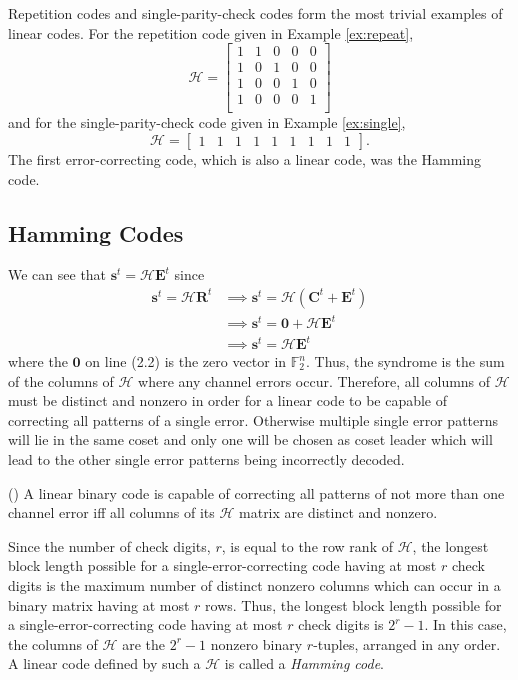 Repetition codes and single-parity-check codes form the most trivial examples of linear codes. For the repetition code given in Example \ref{ex:repeat},
\[
    \mathscr{H} = \left[\begin{array}{ccccc}
        1 & 1 & 0 & 0 & 0\\
        1 & 0 & 1 & 0 & 0\\
        1 & 0 & 0 & 1 & 0\\
        1 & 0 & 0 & 0 & 1\\
    \end{array}\right]
\]
and for the single-parity-check code given in Example \ref{ex:single},
\[
    \mathscr{H} = \left[\begin{array}{ccccccccc}
        1 & 1 & 1 & 1 & 1 & 1 & 1 & 1 & 1
    \end{array}\right].
\]
The first error-correcting code, which is also a linear code, was the Hamming code.

\subsection{Hamming Codes}

We can see that $\textbf{s}^t = \mathscr{H}\textbf{E}^t$ since
\begin{align}
    \textbf{s}^t = \mathscr{H}\textbf{R}^t &\implies \textbf{s}^t = \mathscr{H}\left(\textbf{C}^t + \textbf{E}^t\right)\\
    &\implies \textbf{s}^t = \textbf{0} + \mathscr{H}\textbf{E}^t\\
    &\implies \textbf{s}^t = \mathscr{H}\textbf{E}^t
\end{align}
where the $\textbf{0}$ on line (2.2) is the zero vector in $\mathbb{F}_2^n$. Thus, the syndrome is the sum of the columns of $\mathscr{H}$ where any channel errors occur. Therefore, all columns of $\mathscr{H}$ must be distinct and nonzero in order for a linear code to be capable of correcting all patterns of a single error. Otherwise multiple single error patterns will lie in the same coset and only one will be chosen as coset leader which will lead to the other single error patterns being incorrectly decoded.

\begin{theorem} (\cite{berlekamp})
    A linear binary code is capable of correcting all patterns of not more than one channel error iff all columns of its $\mathscr{H}$ matrix are distinct and nonzero.
\end{theorem}

Since the number of check digits, $r$, is equal to the row rank of $\mathscr{H}$, the longest block length possible for a single-error-correcting code having at most $r$ check digits is the maximum number of distinct nonzero columns which can occur in a binary matrix having at most $r$ rows. Thus, the longest block length possible for a single-error-correcting code having at most $r$ check digits is $2^r - 1$. In this case, the columns of $\mathscr{H}$ are the $2^r - 1$ nonzero binary $r$-tuples, arranged in any order. A linear code defined by such a $\mathscr{H}$ is called a \textit{Hamming code}.

